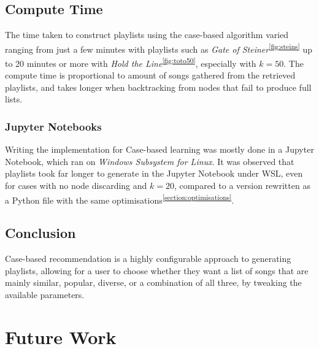 \documentclass[a4paper, 12pt]{report}
\begin{document}
\section{Compute Time}
The time taken to construct playlists using the case-based algorithm varied ranging from just a few minutes with playlists such as \textit{Gate of Steiner}\textsuperscript{\ref{fig:steins}}
up to 20 minutes or more with \textit{Hold the Line}\textsuperscript{\ref{fig:toto50}}, especially with \(k = 50\). The compute time is proportional to amount of songs gathered from the
retrieved playlists, and takes longer when backtracking from nodes that fail to produce full lists.

\subsection*{Jupyter Notebooks}
Writing the implementation for Case-based learning was mostly done in a Jupyter Notebook, which ran on \textit{Windows Subsystem for Linux}.
It was observed that playlists took far longer to generate in the Jupyter Notebook under WSL, even for cases with no node discarding and \(k=20\), compared to a version rewritten as a Python file
with the same optimisations\textsuperscript{\ref{section:optimisations}}.

\section{Conclusion}
Case-based recommendation is a highly configurable approach to generating playlists, allowing for a user to choose whether they want a list of songs that are mainly similar, 
popular, diverse, or a combination of all three, by tweaking the available parameters.

\chapter{Future Work}
\end{document}
